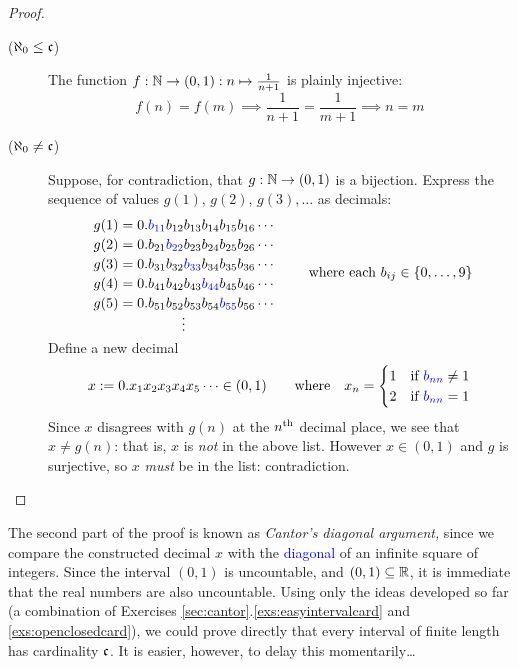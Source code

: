 \begin{proof}
	\begin{description}
		\item[\normalfont ($\aleph_0\le\mathfrak{c}$)] The function $f:\mathbb{N}\to(0,1):n\mapsto \frac 1{n+1}$ is plainly injective:
		\[
			f(n)=f(m)\implies \frac 1{n+1}=\frac 1{m+1}\implies n=m
		\]
		\item[\normalfont ($\aleph_0\neq\mathfrak{c}$)] Suppose, for contradiction, that $g:\mathbb{N}\to(0,1)$ is a bijection. Express the sequence of values $g(1)$, $g(2)$, $g(3),\ldots$ as decimals:\footnotemark
		\[
			\begin{array}{c}
				g(1)=0.\textcolor{blue}{b_{11}}b_{12}b_{13}b_{14}b_{15}b_{16}\cdots\\[2pt]
				g(2)=0.b_{21}\textcolor{blue}{b_{22}}b_{23}b_{24}b_{25}b_{26}\cdots\\[2pt]
				g(3)=0.b_{31}b_{32}\textcolor{blue}{b_{33}}b_{34}b_{35}b_{36}\cdots\\[2pt]
				g(4)=0.b_{41}b_{42}b_{43}\textcolor{blue}{b_{44}}b_{45}b_{46}\cdots\\[2pt]
				g(5)=0.b_{51}b_{52}b_{53}b_{54}\textcolor{blue}{b_{55}}b_{56}\cdots\\[-2pt]
				\vdots\\[-5pt]
			\end{array}
			\qquad
			\text{where each }b_{ij}\in\{0,\ldots,9\}
		\]
		Define a new decimal
		\[
			x:=0.x_1x_2x_3x_4x_5\cdots \in (0,1)\qquad\text{where}\quad x_n=
			\begin{cases}
				1&\text{if }\textcolor{blue}{b_{nn}}\neq 1\\
				2&\text{if }\textcolor{blue}{b_{nn}}=1
			\end{cases}
		\]
		Since $x$ disagrees with $g(n)$ at the $n\textsuperscript{th}$ decimal place, we see that $x\neq g(n)$: that is, $x$ is \emph{not} in the above list. However $x\in(0,1)$ and $g$ is surjective, so $x$ \emph{must} be in the list: contradiction.\qedhere
	\end{description}
\end{proof}


The second part of the proof is known as \emph{Cantor's diagonal argument,} since we compare the constructed decimal $x$ with the \textcolor{blue}{diagonal} of an infinite square of integers. Since the interval $(0,1)$ is uncountable, and $(0,1)\subseteq\mathbb{R}$, it is immediate that the real numbers are also uncountable. Using only the ideas developed so far (a combination of Exercises \ref*{sec:cantor}.\ref{exs:easyintervalcard} and \ref{exs:openclosedcard}), we could prove directly that every interval of finite length has cardinality $\mathfrak{c}$. It is easier, however, to delay this momentarily\ldots\smallbreak


